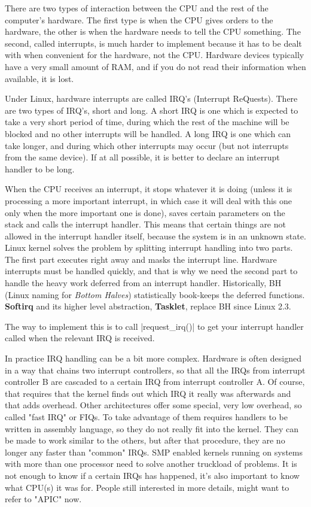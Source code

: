 \documentclass[10pt, oneside]{book}
\begin{document}
There are two types of interaction between the CPU and the rest of the computer's hardware.
The first type is when the CPU gives orders to the hardware, the other is when the hardware needs to tell the CPU something.
The second, called interrupts, is much harder to implement because it has to be dealt with when convenient for the hardware, not the CPU.
Hardware devices typically have a very small amount of RAM, and if you do not read their information when available, it is lost.

Under Linux, hardware interrupts are called IRQ's (Interrupt ReQuests).
There are two types of IRQ's, short and long.
A short IRQ is one which is expected to take a very short period of time, during which the rest of the machine will be blocked and no other interrupts will be handled.
A long IRQ is one which can take longer, and during which other interrupts may occur (but not interrupts from the same device).
If at all possible, it is better to declare an interrupt handler to be long.

When the CPU receives an interrupt, it stops whatever it is doing (unless it is processing a more important interrupt, in which case it will deal with this one only when the more important one is done),
saves certain parameters on the stack and calls the interrupt handler.
This means that certain things are not allowed in the interrupt handler itself, because the system is in an unknown state.
Linux kernel solves the problem by splitting interrupt handling into two parts.
The first part executes right away and masks the interrupt line.
Hardware interrupts must be handled quickly, and that is why we need the second part to handle the heavy work deferred from an interrupt handler.
Historically, BH (Linux naming for \textit{Bottom Halves}) statistically book-keeps the deferred functions.
\textbf{Softirq} and its higher level abstraction, \textbf{Tasklet}, replace BH since Linux 2.3.

The way to implement this is to call \cpp|request_irq()| to get your interrupt handler called when the relevant IRQ is received.

In practice IRQ handling can be a bit more complex.
Hardware is often designed in a way that chains two interrupt controllers, so that all the IRQs from interrupt controller B are cascaded to a certain IRQ from interrupt controller A.
Of course, that requires that the kernel finds out which IRQ it really was afterwards and that adds overhead. Other architectures offer some special, very low overhead, so called "fast IRQ" or FIQs.
To take advantage of them requires handlers to be written in assembly language, so they do not really fit into the kernel.
They can be made to work similar to the others, but after that procedure, they are no longer any faster than "common" IRQs.
SMP enabled kernels running on systems with more than one processor need to solve another truckload of problems.
It is not enough to know if a certain IRQs has happened, it's also important to know what CPU(s) it was for.
People still interested in more details, might want to refer to "APIC" now.
\end{document}
